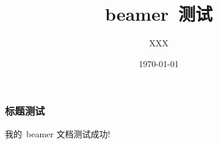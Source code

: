 \documentclass[red]{beamer}
\begin{document}
\title{beamer~测试}
\author{XXX}
\date{\today}
\frame{\titlepage}
\begin{frame}
\frametitle{标题测试}
我的~beamer 文档测试成功!
\end{frame}
\end{document}

